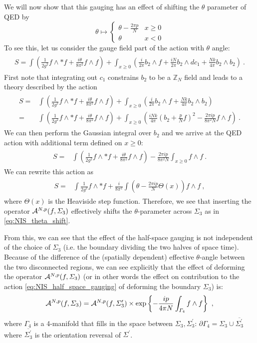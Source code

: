 \documentclass[11pt]{article}
\newcommand{\eq}[1]{\begin{align}\begin{split}#1\end{split}\end{align}}
\def\CA{{\cal A}}
\def\IZ{{\mathbb{Z}}}
\def\beq{\begin{equation}}
\def\eeq{\end{equation}}
\begin{document}
We will now show that this gauging has an effect of shifting the $\theta$ parameter of QED by
%
\beq
\theta \longmapsto \begin{cases} \theta - \frac{2\pi p}{N}&x\geq0\\
\theta&x<0
\end{cases}
\label{eq:NIS_theta_shift}
\eeq
%
To see this, let us consider the gauge field part of the action with $\theta$ angle:
\eq{
S = \int \left(\frac{1}{2g^2} f \wedge * f + \frac{i\theta}{8\pi^2} f \wedge f \right)+
 \int_{x\geq0}\left( \frac{i}{2\pi} b_2 \wedge f + \frac{iN}{2\pi} b_2 \wedge d c_1 + \frac{Nk}{4\pi} b_2 \wedge b_2 \right)~.
 }
  First note that integrating out $c_1$ constrains $b_2$ to be a $\IZ_N$ field and leads to a theory described by the action
%
\eq{
S =& \int\left(\frac{1}{2g^2} f \wedge * f + \frac{i\theta}{8\pi^2} f \wedge f\right) + \int_{x\geq0}\left(\frac{i}{2\pi} b_2 \wedge f + \frac{Nk}{4\pi} b_2 \wedge b_2\right) \\
=& \int\left(\frac{1}{2g^2} f \wedge * f + \frac{i\theta}{8\pi^2}    f \wedge f \right)+ \int_{x\geq0}\left( \frac{i Nk}{4\pi} \left( b_2 + \frac{p}{N} f \right)^2 - \frac{2\pi ip}{8\pi^2 N}  f \wedge f\right)~.
}
%
We can then perform the Gaussian integral over $b_2$ and we arrive at the QED action with additional term defined on $x\geq0$:
\eq{
S 
=& \int\left(\frac{1}{2g^2} f \wedge * f + \frac{i\theta}{8\pi^2}    f \wedge f \right) - \frac{2\pi ip}{8\pi^2 N} \int_{x\geq0}  f \wedge f~.}
We can rewrite this action as 
\eq{
S=&\int\frac{1}{2g^2} f \wedge * f + \frac{i}{8\pi^2}\int \left(\theta-  \frac{2\pi ip}{ N} \Theta(x)\right)  f \wedge f ~,
}
where $\Theta(x)$ is the Heaviside step function. Therefore, we see that inserting the operator $\CA^{N,p}(f,\Sigma_3)$ effectively shifts the $\theta$-parameter across $\Sigma_3$ as in \eqref{eq:NIS_theta_shift}.

From this, we can see that the effect of the half-space gauging is not independent of the choice of $\Sigma_3$ (i.e. the boundary dividing the two halves of space time). Because of the  difference of the (spatially dependent) effective $\theta$-angle between the two disconnected regions, we can see explicitly that the effect of deforming the operator $\CA^{N,p}(f,\Sigma_3)$ (or in other words the effect on contribution to the action \eqref{eq:NIS_half_space_gauging} of deforming the boundary $\Sigma_3$) is:
\eq{\label{MinimalAVar}
\CA^{N,p}(f,\Sigma_3)=\CA^{N,p}(f,\Sigma_3^\prime)\times {\rm exp}\left\{
-\frac{ip}{4\pi N}\int_{\Gamma_4} f\wedge f
\right\}~, 
}
where $\Gamma_4$ is a 4-manifold that fills in the space between $\Sigma_3,\Sigma_3^\prime$: $\partial \Gamma_4=\Sigma_3\cup \overline{\Sigma_3^{\prime}}$ where $\overline{\Sigma_3^{\prime}}$ is the orientation reversal of $\Sigma^\prime$. 
\end{document}
